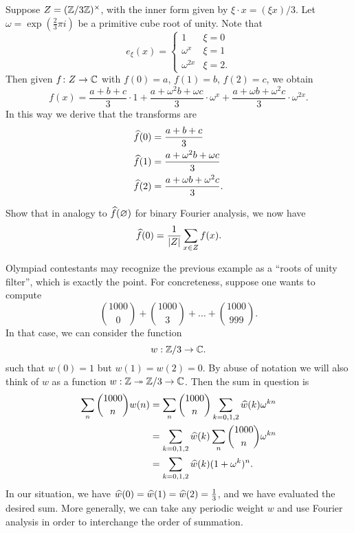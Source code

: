 \begin{example}
	Suppose $Z = (\mathbb Z/3\mathbb Z)^\times$, with the inner form given by $\xi \cdot x = (\xi x)/3$.
	Let $\omega = \exp(\frac 23 \pi i)$ be a primitive cube root of unity.
	Note that
	\[ e_\xi(x) = \begin{cases}
			1 & \xi = 0 \\
			\omega^x & \xi = 1 \\
			\omega^{2x} & \xi = 2.
		\end{cases} \]
	Then given $f \colon Z \to \mathbb C$ with $f(0) = a$, $f(1) = b$, $f(2) = c$,
	we obtain
	\[ f(x) = \frac{a+b+c}{3} \cdot 1
		+ \frac{a + \omega^2 b + \omega c}{3} \cdot \omega^x
		+ \frac{a + \omega b + \omega^2 c}{3} \cdot \omega^{2x}.  \]
	In this way we derive that the transforms are
	\begin{align*}
		\widehat f(0) &= \frac{a+b+c}{3} \\
		\widehat f(1) &= \frac{a+\omega^2 b+ \omega c}{3} \\
		\widehat f(2) &= \frac{a+\omega b+\omega^2c}{3}.
	\end{align*}
\end{example}
\begin{exercise}
	Show that in analogy to $\widehat f(\varnothing)$
	for binary Fourier analysis, we now have
	\[ \widehat f(0) = \frac{1}{|Z|} \sum_{x \in Z} f(x). \]
\end{exercise}
Olympiad contestants may recognize the previous example
as a ``roots of unity filter'', which is exactly the point.
For concreteness, suppose one wants to compute
\[ \binom{1000}{0} + \binom{1000}{3} + \dots + \binom{1000}{999}. \]
In that case, we can consider the function
\[ w : \mathbb Z/3 \to \mathbb C. \]
such that $w(0) = 1$ but $w(1) = w(2) = 0$.
By abuse of notation we will also think of $w$
as a function $w : \mathbb Z \twoheadrightarrow \mathbb Z/3 \to \mathbb C$.
Then the sum in question is
\begin{align*}
	\sum_n \binom{1000}{n} w(n)
	&= \sum_n \binom{1000}{n} \sum_{k=0,1,2} \widehat w(k) \omega^{kn} \\
	&= \sum_{k=0,1,2} \widehat w(k) \sum_n \binom{1000}{n} \omega^{kn} \\
	&= \sum_{k=0,1,2} \widehat w(k) (1+\omega^k)^n.
\end{align*}
In our situation, we have $\widehat w(0) = \widehat w(1) = \widehat w(2) = \frac13$,
and we have evaluated the desired sum.
More generally, we can take any periodic weight $w$
and use Fourier analysis in order to interchange the order of summation.

